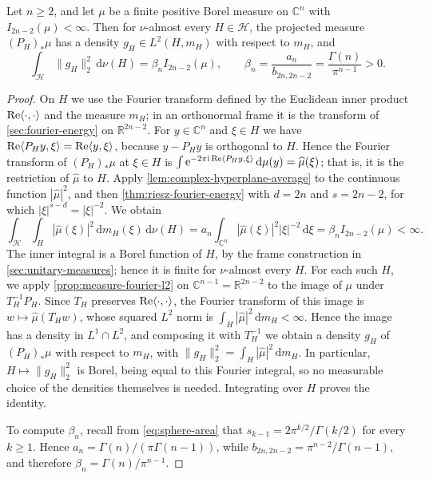 \begin{theorem}\label{thm:complex-projection-l2}
Let $n\geq2$, and let $\mu$ be a finite positive Borel measure on $\mathbb C^n$ with $I_{2n-2}(\mu)<\infty$. Then for $\nu$-almost every $H\in\mathcal H$, the projected measure $(P_H)_*\mu$ has a density $g_H\in L^2(H,m_H)$ with respect to $m_H$, and
\[
 \int_{\mathcal H}\|g_H\|_2^2\,\mathrm d\nu(H)=\beta_n I_{2n-2}(\mu),
 \qquad \beta_n=\frac{a_n}{b_{2n,2n-2}}=\frac{\Gamma(n)}{\pi^{n-1}}>0.
\]
\end{theorem}
\begin{proof}
On $H$ we use the Fourier transform defined by the Euclidean inner product $\operatorname{Re}\langle\cdot,\cdot\rangle$ and the measure $m_H$; in an orthonormal frame it is the transform of \cref{sec:fourier-energy} on $\mathbb R^{2n-2}$. For $y\in\mathbb C^n$ and $\xi\in H$ we have $\operatorname{Re}\langle P_Hy,\xi\rangle=\operatorname{Re}\langle y,\xi\rangle$, because $y-P_Hy$ is orthogonal to $H$. Hence the Fourier transform of $(P_H)_*\mu$ at $\xi\in H$ is $\int\mathrm e^{-2\pi\mathrm i\operatorname{Re}\langle P_Hy,\xi\rangle}\,\mathrm d\mu(y)=\widehat\mu(\xi)$; that is, it is the restriction of $\widehat\mu$ to $H$. Apply \cref{lem:complex-hyperplane-average} to the continuous function $|\widehat\mu|^2$, and then \cref{thm:riesz-fourier-energy} with $d=2n$ and $s=2n-2$, for which $|\xi|^{s-d}=|\xi|^{-2}$. We obtain
\[
 \int_{\mathcal H}\int_H|\widehat\mu(\xi)|^2\,\mathrm d m_H(\xi)\,\mathrm d\nu(H)
 =a_n\int_{\mathbb C^n}|\widehat\mu(\xi)|^2|\xi|^{-2}\,\mathrm d\xi=\beta_n I_{2n-2}(\mu)<\infty.
\]
The inner integral is a Borel function of $H$, by the frame construction in \cref{sec:unitary-measures}; hence it is finite for $\nu$-almost every $H$. For each such $H$, we apply \cref{prop:measure-fourier-l2} on $\mathbb C^{n-1}=\mathbb R^{2n-2}$ to the image of $\mu$ under $T_H^{-1}P_H$. Since $T_H$ preserves $\operatorname{Re}\langle\cdot,\cdot\rangle$, the Fourier transform of this image is $w\mapsto\widehat\mu(T_Hw)$, whose squared $L^2$ norm is $\int_H|\widehat\mu|^2\,\mathrm d m_H<\infty$. Hence the image has a density in $L^1\cap L^2$, and composing it with $T_H^{-1}$ we obtain a density $g_H$ of $(P_H)_*\mu$ with respect to $m_H$, with $\|g_H\|_2^2=\int_H|\widehat\mu|^2\,\mathrm d m_H$. In particular, $H\mapsto\|g_H\|_2^2$ is Borel, being equal to this Fourier integral, so no measurable choice of the densities themselves is needed. Integrating over $H$ proves the identity.

To compute $\beta_n$, recall from \eqref{eq:sphere-area} that $s_{k-1}=2\pi^{k/2}/\Gamma(k/2)$ for every $k\geq1$. Hence $a_n=\Gamma(n)/(\pi\Gamma(n-1))$, while $b_{2n,2n-2}=\pi^{n-2}/\Gamma(n-1)$, and therefore $\beta_n=\Gamma(n)/\pi^{n-1}$.
\end{proof}

